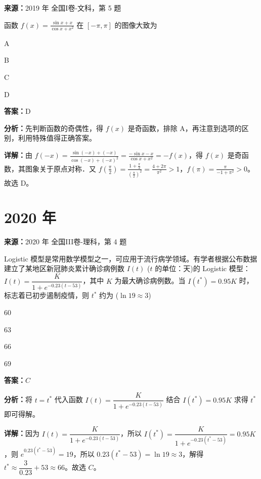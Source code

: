 \begin{question}[points=5]
\textbf{来源：}2019 年 全国I卷-文科，第 5 题\par
函数 $f(x)=\frac{\sin x + x}{\cos x + x^2}$ 在 $[-\pi,\pi]$ 的图像大致为
\begin{choices}
  \item A
  \item B
  \item C
  \item D
\end{choices}
\begin{solution}
\textbf{答案：}D

\textbf{分析：}先判断函数的奇偶性，得 $f(x)$ 是奇函数，排除 A，再注意到选项的区别，利用特殊值得正确答案。

\textbf{详解：}由 $f(-x)=\frac{\sin(-x)+(-x)}{\cos(-x)+(-x)^2} = \frac{-\sin x - x}{\cos x + x^2} = -f(x)$，得 $f(x)$ 是奇函数，其图象关于原点对称．又 $f(\frac{\pi}{2}) = \frac{1+\frac{\pi}{2}}{(\frac{\pi}{2})^2} = \frac{4+2\pi}{\pi^2} > 1$，$f(\pi) = \frac{\pi}{-1+\pi^2} > 0$。故选 D。
\end{solution}
\end{question}

\section*{2020 年}

\begin{question}[points=5]
\textbf{来源：}2020 年 全国III卷-理科，第 4 题\par
Logistic 模型是常用数学模型之一，可应用于流行病学领域。有学者根据公布数据建立了某地区新冠肺炎累计确诊病例数 $I(t)$ ($t$ 的单位：天)的 Logistic 模型：$I(t)=\dfrac{K}{1+e^{-0.23(t-53)}}$，其中 $K$ 为最大确诊病例数。当 $I(t^*)=0.95K$ 时，标志着已初步遏制疫情，则 $t^*$ 约为 ($\ln 19\approx 3$)
\begin{choices}
  \item $60$
  \item $63$
  \item $66$
  \item $69$
\end{choices}
\begin{solution}
\textbf{答案：}$C$

\textbf{分析：}将 $t=t^*$ 代入函数 $I(t)=\dfrac{K}{1+e^{-0.23(t-53)}}$ 结合 $I(t^*)=0.95K$ 求得 $t^*$ 即可得解。

\textbf{详解：}因为 $I(t)=\dfrac{K}{1+e^{-0.23(t-53)}}$，所以 $I(t^*)=\dfrac{K}{1+e^{-0.23(t^*-53)}}=0.95K$，则 $e^{0.23(t^*-53)}=19$，所以 $0.23(t^*-53)=\ln 19\approx3$，解得 $t^*\approx\dfrac{3}{0.23}+53\approx66$。故选 $C$。
\end{solution}
\end{question}


